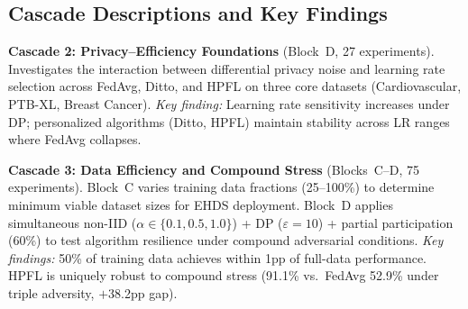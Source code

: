 \documentclass[conference,a4paper]{IEEEtran}
\begin{document}
\begin{table}[htbp]
\centering
\caption{Clinical Dataset Portfolio for FL-EHDS Evaluation}
\label{tab:dataset_portfolio}
\end{table}

\subsection{Cascade Descriptions and Key Findings}

\noindent\textbf{Cascade 2: Privacy--Efficiency Foundations} (Block~D, 27 experiments). Investigates the interaction between differential privacy noise and learning rate selection across FedAvg, Ditto, and HPFL on three core datasets (Cardiovascular, PTB-XL, Breast Cancer). \textit{Key finding:} Learning rate sensitivity increases under DP; personalized algorithms (Ditto, HPFL) maintain stability across LR ranges where FedAvg collapses.

\smallskip\noindent\textbf{Cascade 3: Data Efficiency and Compound Stress} (Blocks~C--D, 75 experiments). Block~C varies training data fractions (25--100\%) to determine minimum viable dataset sizes for EHDS deployment. Block~D applies simultaneous non-IID ($\alpha \in \{0.1, 0.5, 1.0\}$) + DP ($\varepsilon{=}10$) + partial participation (60\%) to test algorithm resilience under compound adversarial conditions. \textit{Key findings:} 50\% of training data achieves within 1pp of full-data performance. HPFL is uniquely robust to compound stress (91.1\% vs.\ FedAvg 52.9\% under triple adversity, $+$38.2pp gap).
\end{document}
